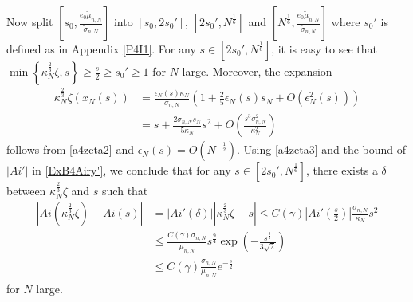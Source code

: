 \documentclass[11pt]{article}
\numberwithin{equation}{section}%
\numberwithin{theorem}{section}
\begin{document}
     Now split $\left[s_0,\frac{e_0\tilde\mu_{n,N}}{\tilde\sigma_{n,N}}\right]$ into $[s_0,2s_0']$, $\left[2s_0',N^{\frac{1}{6}}\right]$ and $\left[N^\frac{1}{6},\frac{e_0\tilde\mu_{n,N}}{\tilde\sigma_{n,N}}\right]$ where $s_0'$ is defined as in Appendix \ref{P4I1}. For any $s\in[2s_0',N^{\frac{1}{6}}]$, it is easy to see that $\min\left\{\kappa_N^\frac{2}{3}\zeta,s\right\}\ge\frac{s}{2}\ge s_0'\ge1$ for $N$ large. Moreover, the expansion
     \begin{equation}\label{a4zeta3}
     \begin{split}
         \kappa_N^\frac{2}{3}\zeta(x_N(s))&=\frac{\epsilon_N(s)\kappa_N}{\sigma_{n,N}}\left(1+\frac{2}{5}\epsilon_N(s)s_N+O(\epsilon_N^2(s))\right)\\&=s+\frac{2\sigma_{n,N}s_N}{5\kappa_N}s^2+O\left(\frac{s^3\sigma_{n,N}^2}{\kappa_N^2}\right) 
     \end{split}
     \end{equation}
     follows from \eqref{a4zeta2} and $\epsilon_N(s)=O\left(N^{-\frac{1}{2}}\right)$. Using \eqref{a4zeta3} and the bound of $|Ai'|$ in \eqref{ExB4Airy'}, we conclude that for any $s\in\left[2s_0',N^{\frac{1}{6}}\right]$, there exists a $\delta$ between $\kappa_N^\frac{2}{3}\zeta$ and $s$ such that
     \begin{equation}\label{1st4D}
         \begin{split}
             \left|Ai\left(\kappa_N^\frac{2}{3}\zeta\right)-Ai(s)\right|&=|Ai'(\delta)|\left|\kappa_N^\frac{2}{3}\zeta-s\right|\le C(\gamma)\left|Ai'\left(\frac{s}{2}\right)\right|\frac{\sigma_{n,N}}{\kappa_N}s^2\\
             &\le\frac{C(\gamma)\sigma_{n,N}}{\mu_{n,N}}s^{\frac{9}{4}}\exp\left(-\frac{s^{\frac{3}{2}}}{3\sqrt2}\right)\\&\le C(\gamma)\frac{\sigma_{n,N}}{\mu_{n,N}}e^{-\frac{s}{2}}
         \end{split}
     \end{equation}
     for $N$ large.
\end{document}
